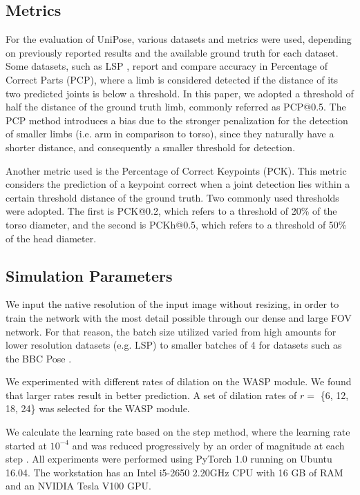 \documentclass[10pt,twocolumn,letterpaper]{article}
\begin{document}
\subsection{Metrics}
For the evaluation of UniPose, various datasets and metrics were used, depending on previously reported results and the available ground truth for each dataset.
Some datasets, such as LSP \cite{LSP}, report and compare accuracy in Percentage of Correct Parts (PCP), where a limb is considered detected if the distance of its two predicted joints is below a threshold. In this paper, we adopted a threshold of half the distance of the ground truth limb, commonly referred as PCP@0.5.
The PCP method introduces a bias due to the stronger penalization for the detection of smaller limbs (i.e. arm in comparison to torso), since they naturally have a shorter distance, and consequently a smaller threshold for detection.

Another metric used is the Percentage of Correct Keypoints (PCK). This metric considers the prediction of a keypoint correct when a joint detection lies within a certain threshold distance of the ground truth. 
Two commonly used thresholds were adopted. The first is PCK@0.2, which refers to a threshold of 20\% of the torso diameter, and the second is PCKh@0.5, which refers to a threshold of 50\% of the head diameter.

\subsection{Simulation Parameters}
We input the native resolution of the input image without resizing, in order to train the network with the most detail possible through our dense and large FOV network. 
For that reason, the batch size utilized varied from high amounts for lower resolution datasets (e.g. LSP) to smaller batches of 4 for datasets such as the BBC Pose \cite{BBC}.

We experimented with different rates of dilation on the WASP module. We found that larger rates result in better prediction. A set of dilation rates of $r =$ \{6, 12, 18, 24\} was selected for the WASP module.

We calculate the learning rate based on the step method, where the learning rate started at $10^{-4}$ and was reduced progressively by an order of magnitude at each step \cite{Parsenet}. 
All experiments were performed using PyTorch 1.0 running on Ubuntu 16.04. The workstation has an Intel i5-2650 2.20GHz CPU with 16 GB of RAM and an NVIDIA Tesla V100 GPU.
\end{document}
